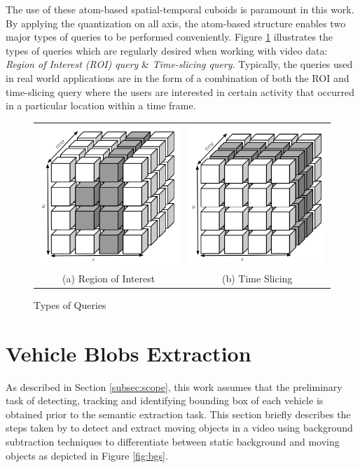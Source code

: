 The use of these atom-based spatial-temporal cuboids is paramount in this work. By applying the quantization on all axis, the atom-based structure enables two major types of queries to be performed conveniently. Figure \ref{fig:typesofQuery} illustrates the types of queries which are regularly desired when working with video data: \textit{Region of Interest (ROI) query} \& \textit{Time-slicing query}. Typically, the queries used in real world applications are in the form of a combination of both the ROI and time-slicing query where the users are interested in certain activity that occurred in a particular location within a time frame.




\begin{figure}[htb!]
  \centering


\begin{tabular}{cc}
 \includegraphics[width=0.3\linewidth]{image/general/atom_ROI.PNG} &  \includegraphics[width=0.3\linewidth]{image/general/atom_time_slicing.PNG}\\
(a) Region of Interest & (b) Time Slicing
\end{tabular}


\caption{Types of Queries} \label{fig:typesofQuery}
\end{figure}



\section{Vehicle Blobs Extraction}
\label{subsection:fundamental}

As described in Section \ref{subsec:scope}, this work assumes that the preliminary task of detecting, tracking and identifying bounding box of each vehicle is obtained prior to the semantic extraction task. This section briefly describes the steps taken by  to detect and extract moving objects in a video using background subtraction techniques to differentiate between static background and moving objects as depicted in Figure \ref{fig:bgs}.

